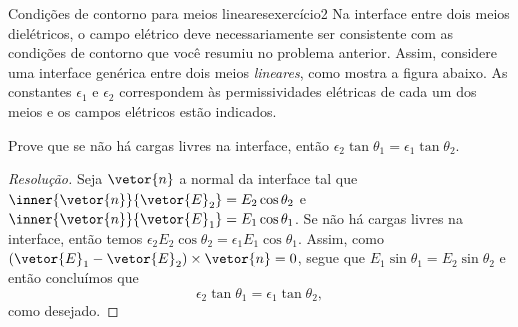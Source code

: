 \begin{exercício}{Condições de contorno para meios lineares}{exercício2}
    Na interface entre dois meios dielétricos, o campo elétrico deve necessariamente ser consistente com as condições de contorno que você resumiu no problema anterior. Assim, considere uma interface genérica entre dois meios \emph{lineares}, como mostra a figura abaixo. As constantes \(\epsilon_1\) e \(\epsilon_2\) correspondem às permissividades elétricas de cada um dos meios e os campos elétricos estão indicados.

    \begin{center}
    \end{center}

    Prove que se não há cargas livres na interface, então \(\epsilon_2 \tan{\theta_1} = \epsilon_1 \tan{\theta_2}\).
\end{exercício}
\begin{proof}[Resolução]
    Seja \(\vetor{n}\) a normal da interface tal que \(\inner{\vetor{n}}{\vetor{E}_2} = E_2 \cos\theta_2\) e \(\inner{\vetor{n}}{\vetor{E}_1} = E_1 \cos\theta_1\). Se não há cargas livres na interface, então temos \(\epsilon_2 E_2 \cos\theta_2 = \epsilon_1 E_1 \cos\theta_1\). Assim, como \((\vetor{E}_1-\vetor{E}_2)\times\vetor{n} = 0\), segue que \(E_1 \sin\theta_1 = E_2\sin\theta_2\) e então concluímos que
    \begin{equation*}
        \epsilon_2 \tan\theta_1 = \epsilon_1 \tan\theta_2,
    \end{equation*}
    como desejado.
\end{proof}
